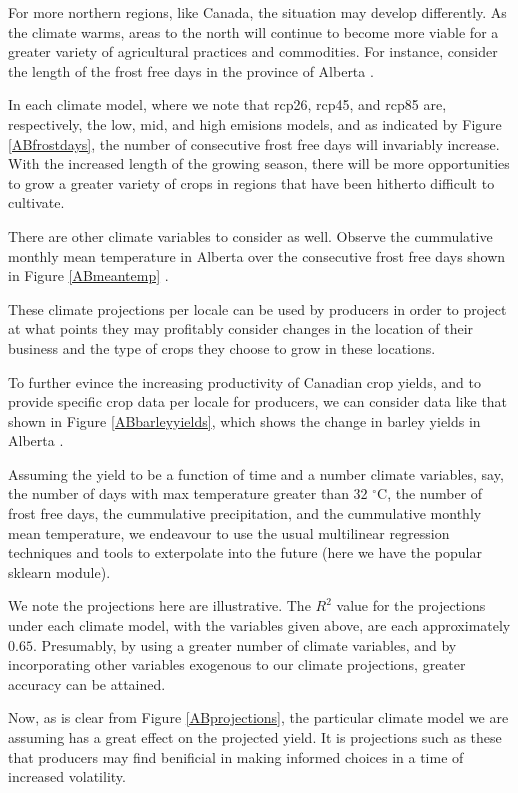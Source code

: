 \documentclass[11pt]{article}
\numberwithin{equation}{section}
\begin{document}
For more northern regions, like Canada, the situation may develop differently. As the climate warms, areas to the north will continue to become more viable for a greater variety of agricultural practices and commodities. For instance, consider the length of the frost free days in the province of Alberta \cite{climate-data}.

In each climate model, where we note that rcp26, rcp45, and rcp85 are, respectively, the low, mid, and high emisions models, and as indicated by Figure \ref{ABfrostdays}, the number of consecutive frost free days will invariably increase. With the increased length of the growing season, there will be more opportunities to grow a greater variety of crops in regions that have been hitherto difficult to cultivate.

There are other climate variables to consider as well. Observe the cummulative monthly mean temperature in Alberta over the consecutive frost free days shown in Figure \ref{ABmeantemp} \cite{climate-data}.

These climate projections per locale can be used by producers in order to project at what points they may profitably consider changes in the location of their business and the type of crops they choose to grow in these locations.

To further evince the increasing productivity of Canadian crop yields, and to provide specific crop data per locale for producers, we can consider data like that shown in Figure \ref{ABbarleyyields}, which shows the change in barley yields in Alberta \cite{stat-can}. 

Assuming the yield to be a function of time and a number climate variables, say, the number of days with max temperature greater than 32 $^\circ$C, the number of frost free days, the cummulative precipitation, and the cummulative monthly mean temperature, we endeavour to use the usual multilinear regression techniques and tools to exterpolate into the future (here we have the popular sklearn module).

We note the projections here are illustrative. The $R^2$ value for the projections under each climate model, with the variables given above, are each approximately $0.65$. Presumably, by using a greater number of climate variables, and by incorporating other variables exogenous to our climate projections, greater accuracy can be attained.  

Now, as is clear from Figure \ref{ABprojections}, the particular climate model we are assuming has a great effect on the projected yield. It is projections such as these that producers may find benificial in making informed choices in a time of increased volatility.
\end{document}
